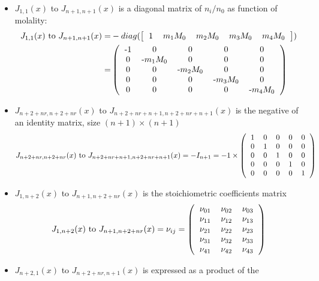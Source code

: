 \documentclass[onecolumn]{article}
\begin{document}
\begin{itemize}
\item $J_{1,1}(x)$ to $J_{n+1,n+1}(x)$ is a diagonal matrix of $n_i/n_0$
as function of molality:
\[
\begin{aligned}
J_{1,1}(x) \text{ to } J_{n+1,n+1}(x) = &
-diag( \left[
\begin{tabular}{ccccc}
1 & $m_1 M_0$ & $m_2 M_0$ & $m_3 M_0$ & $m_4 M_0$\\
\end{tabular}
\right]
)\\
= & \left(
\begin{tabular}{ccccc}
-1 & 0 & 0 & 0 & 0\\
0 & -$m_1 M_0$ & 0 & 0 & 0\\
0 & 0 & -$m_2 M_0$ & 0 & 0\\
0 & 0 & 0 & -$m_3 M_0$ & 0\\
0 & 0 & 0 & 0 & -$m_4 M_0$\\
\end{tabular}
\right)
\end{aligned}
\]
\item $J_{n+2+nr,n+2+nr}(x)$ to $J_{n+2+nr+n+1,n+2+nr+n+1}(x)$
is the negative of an identity matrix, size $(n+1) \times (n+1)$
\[
J_{n+2+nr,n+2+nr}(x) \text{ to } J_{n+2+nr+n+1,n+2+nr+n+1}(x) =
-I_{n+1} = -1\times \left(
\begin{tabular}{ccccc}
1 & 0 & 0 & 0 & 0\\
0 & 1 & 0 & 0 & 0\\
0 & 0 & 1 & 0 & 0\\
0 & 0 & 0 & 1 & 0\\
0 & 0 & 0 & 0 & 1\\
\end{tabular}
\right)
\]
\item $J_{1,n+2}(x)$ to $J_{n+1,n+2+nr}(x)$ is the stoichiometric coefficients
matrix
\[
J_{1,n+2}(x) \text{ to } J_{n+1,n+2+nr}(x) = \nu_{ij} =\left(
\begin{tabular}{ccc}
$\nu_{01}$ & $\nu_{02}$ & $\nu_{03}$\\
$\nu_{11}$ & $\nu_{12}$ & $\nu_{13}$\\
$\nu_{21}$ & $\nu_{22}$ & $\nu_{23}$\\
$\nu_{31}$ & $\nu_{32}$ & $\nu_{33}$\\
$\nu_{41}$ & $\nu_{42}$ & $\nu_{43}$\\
\end{tabular}
\right)
\]
\item $J_{n+2,1}(x)$ to $J_{n+2+nr,n+1}(x)$ is expressed as a product of the

\end{itemize}
\end{document}
